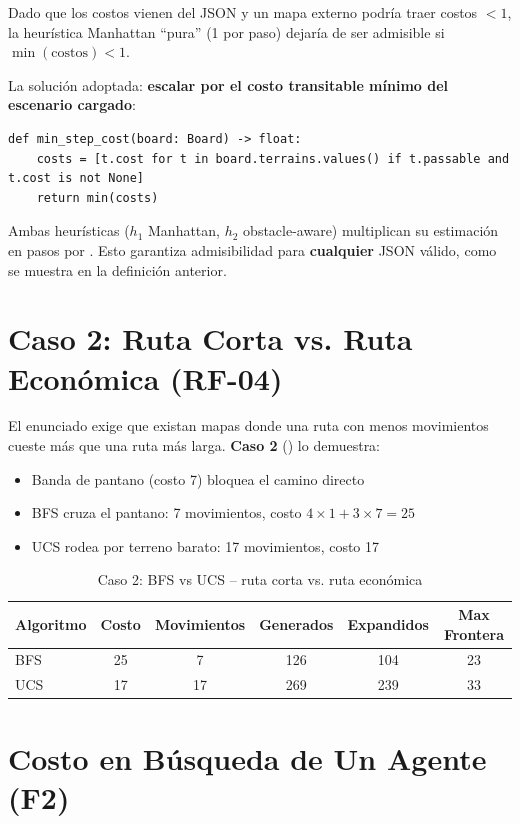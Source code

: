 Dado que los costos vienen del JSON y un mapa externo podría traer costos $< 1$, la heurística
Manhattan ``pura'' (1 por paso) dejaría de ser admisible si $\min(\text{costos}) < 1$.

La solución adoptada: \textbf{escalar por el costo transitable mínimo del escenario cargado}:

\begin{verbatim}
def min_step_cost(board: Board) -> float:
    costs = [t.cost for t in board.terrains.values() if t.passable and t.cost is not None]
    return min(costs)
\end{verbatim}

Ambas heurísticas ($h_1$ Manhattan, $h_2$ obstacle-aware) multiplican su estimación en
pasos por . Esto garantiza admisibilidad para \textbf{cualquier}
JSON válido, como se muestra en la definición anterior.

\section{Caso 2: Ruta Corta vs. Ruta Económica (RF-04)}
\label{sec:caso2}

El enunciado exige que existan mapas donde una ruta con menos movimientos cueste más que una
ruta más larga. \textbf{Caso 2} () lo demuestra:

\begin{itemize}
\item Banda de pantano (costo 7) bloquea el camino directo
\item BFS cruza el pantano: 7 movimientos, costo $4\times1 + 3\times7 = 25$
\item UCS rodea por terreno barato: 17 movimientos, costo 17
\end{itemize}

\begin{table}[H]
\centering
\caption{Caso 2: BFS vs UCS -- ruta corta vs. ruta económica}
\begin{tabular}{lccccc}
\toprule
Algoritmo & Costo & Movimientos & Generados & Expandidos & Max Frontera \\
\midrule
BFS & 25 & 7 & 126 & 104 & 23 \\
UCS & 17 & 17 & 269 & 239 & 33 \\
\bottomrule
\end{tabular}
\end{table}
\label{tab:caso2}


\section{Costo en Búsqueda de Un Agente (F2)}
\label{sec:costo-unagente}

